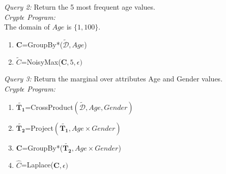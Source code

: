 \begin{exmp}\textit{Query 2:} Return the 5 most frequent age values.\\\textit{Crypt$\epsilon$ Program:}\\ The domain of $Age$ is $\{1,100\}$.\begin{enumerate} \item $\mathbf{C}$=\textsf{GroupBy*}($\boldsymbol{\tilde{\mathcal{D}}},Age$)   \item $\tilde{C}$=\textsf{NoisyMax}($\mathbf{C},5,\epsilon)$\end{enumerate}\end{exmp}
\begin{exmp}\textit{Query 3:} Return the marginal over attributes Age and Gender values.\\\textit{Crypt$\epsilon$ Program:} \begin{enumerate} \item $\tilde{\mathbf{T_1}}$=\textsf{CrossProduct}$(\boldsymbol{\tilde{\mathcal{D}}},Age,Gender)$ \item $\tilde{\mathbf{T_2}}$=\textsf{Project}$(\tilde{\mathbf{T_1}}, Age \times Gender)$\item  $\mathbf{C}$=\textsf{GroupBy*}($\tilde{\mathbf{T_2}},Age \times Gender $)   \item $\hat{C}$=\textsf{Laplace}($\mathbf{C},\epsilon)$\end{enumerate}\end{exmp}

